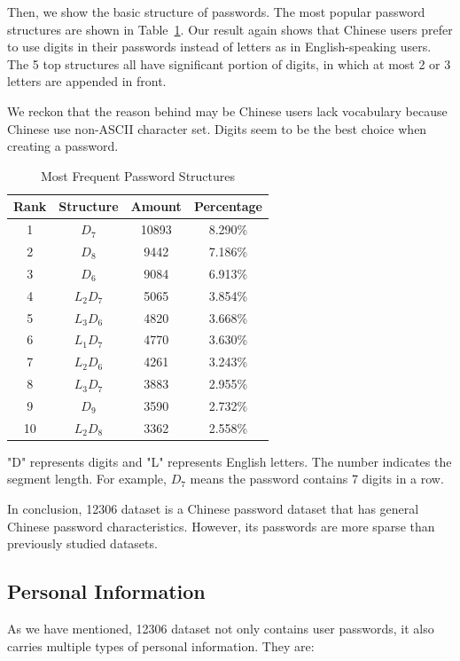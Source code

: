 \documentclass{sig-alternate}
\begin{document}
Then, we show the basic structure of passwords. The most popular password structures are shown in Table~\ref{t2}. Our result again shows that Chinese users prefer to use digits in their passwords instead of letters as in English-speaking users. The 5 top structures all have significant portion of digits, in which at most 2 or 3 letters are appended in front.

We reckon that the reason behind may be Chinese users lack vocabulary because Chinese use non-ASCII character set. Digits seem to be the best choice when creating a password.

\begin{table}
\label{t2}
\centering
\caption{Most Frequent Password Structures}
\begin{tabular}{|c|c|c|c|} \hline
Rank&Structure&Amount&Percentage\\ \hline
1&$D_7$&10893&8.290\%\\ 
2&$D_8$&9442&7.186\%\\ 
3&$D_6$&9084&6.913\%\\ 
4&$L_2D_7$&5065&3.854\%\\ 
5&$L_3D_6$&4820&3.668\%\\ 
6&$L_1D_7$&4770&3.630\%\\ 
7&$L_2D_6$&4261&3.243\%\\ 
8&$L_3D_7$&3883&2.955\%\\ 
9&$D_9$&3590&2.732\%\\ 
10&$L_2D_8$&3362&2.558\%\\ 
\hline\end{tabular}
\begin{tablenotes}
      \small
      \item "D" represents digits and "L" represents English letters. The number indicates the segment length. For example, $D_7$ means the password contains 7 digits in a row.
    \end{tablenotes}
\end{table}

In conclusion, 12306 dataset is a Chinese password dataset that has general Chinese password characteristics. However, its passwords are more sparse than previously studied datasets. 

\subsection{Personal Information}
As we have mentioned, 12306 dataset not only contains user passwords, it also carries multiple types of personal information. They are:
\end{document}
